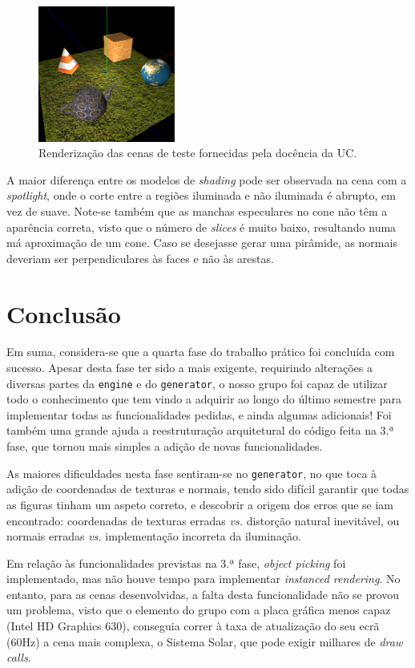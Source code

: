 \documentclass[12pt, a4paper]{article}
\begin{document}
\begin{figure}[H]
    \includegraphics[width=0.4\textwidth]{res/phase4/results/Test6.png}
    \caption{Renderização das cenas de teste fornecidas pela docência da UC.}
\end{figure}

A maior diferença entre os modelos de \emph{shading} pode ser observada na cena com a
\emph{spotlight}, onde o corte entre a regiões iluminada e não iluminada é abrupto, em vez de suave.
Note-se também que as manchas especulares no cone não têm a aparência correta, visto que o número de
\emph{slices} é muito baixo, resultando numa má aproximação de um cone. Caso se desejasse gerar uma
pirâmide, as normais deveriam ser perpendiculares às faces e não às arestas.

\section{Conclusão}

Em suma, considera-se que a quarta fase do trabalho prático foi concluída com sucesso. Apesar desta
fase ter sido a mais exigente, requirindo alterações a diversas partes da \texttt{engine} e do
\texttt{generator}, o nosso grupo foi capaz de utilizar todo o conhecimento que tem vindo a adquirir
ao longo do último semestre para implementar todas as funcionalidades pedidas, e ainda algumas
adicionais! Foi também uma grande ajuda a reestruturação arquitetural do código feita na 3.ª fase,
que tornou mais simples a adição de novas funcionalidades.

As maiores dificuldades nesta fase sentiram-se no \texttt{generator}, no que toca à adição de
coordenadas de texturas e normais, tendo sido difícil garantir que todas as figuras tinham um aspeto
correto, e descobrir a origem dos erros que se iam encontrado: coordenadas de texturas erradas
\emph{vs.} distorção natural inevitável, ou normais erradas \emph{vs.} implementação incorreta da
iluminação.

Em relação às funcionalidades previstas na 3.ª fase, \emph{object picking} foi implementado, mas não
houve tempo para implementar \emph{instanced rendering}. No entanto, para as cenas desenvolvidas, a
falta desta funcionalidade não se provou um problema, visto que o elemento do grupo com a placa
gráfica menos capaz (Intel HD Graphics 630), conseguia correr à taxa de atualização do seu ecrã
(60Hz) a cena mais complexa, o Sistema Solar, que pode exigir milhares de \emph{draw calls}.
\end{document}
